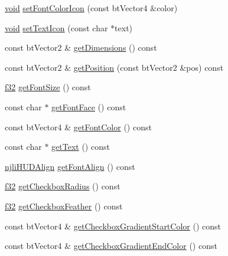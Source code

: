 \begin{DoxyCompactItemize}
\item 
\mbox{\hyperlink{_thread_8h_af1e856da2e658414cb2456cb6f7ebc66}{void}} \mbox{\hyperlink{classnjli_1_1_checkbox_h_u_d_ab23a6ab181e6698b8653c0c8f45a5b78}{set\+Font\+Color\+Icon}} (const bt\+Vector4 \&color)
\item 
\mbox{\hyperlink{_thread_8h_af1e856da2e658414cb2456cb6f7ebc66}{void}} \mbox{\hyperlink{classnjli_1_1_checkbox_h_u_d_ab1fe6f159b1937786b4c070c682220f9}{set\+Text\+Icon}} (const char $\ast$text)
\item 
const bt\+Vector2 \& \mbox{\hyperlink{classnjli_1_1_checkbox_h_u_d_aeb52009f01f539521dc28b4db919a148}{get\+Dimensions}} () const
\item 
const bt\+Vector2 \& \mbox{\hyperlink{classnjli_1_1_checkbox_h_u_d_a88e5d4d16effbda2538969d951b054a3}{get\+Position}} (const bt\+Vector2 \&pos) const
\item 
\mbox{\hyperlink{_util_8h_a5f6906312a689f27d70e9d086649d3fd}{f32}} \mbox{\hyperlink{classnjli_1_1_checkbox_h_u_d_a3a31f385e84c25268b677583af6fdd62}{get\+Font\+Size}} () const
\item 
const char $\ast$ \mbox{\hyperlink{classnjli_1_1_checkbox_h_u_d_a2c42628c8c36649eab6e05a5737d7abb}{get\+Font\+Face}} () const
\item 
const bt\+Vector4 \& \mbox{\hyperlink{classnjli_1_1_checkbox_h_u_d_a291bcdad7b79356d6820a0224c15a85c}{get\+Font\+Color}} () const
\item 
const char $\ast$ \mbox{\hyperlink{classnjli_1_1_checkbox_h_u_d_a22abee806c987db2852b4475d41d62bf}{get\+Text}} () const
\item 
\mbox{\hyperlink{namespacenjli_a376c3102aef4710f2b54a545bf0e2b3a}{njli\+H\+U\+D\+Align}} \mbox{\hyperlink{classnjli_1_1_checkbox_h_u_d_a92870d62459f239e7866f9fbf32757a9}{get\+Font\+Align}} () const
\item 
\mbox{\hyperlink{_util_8h_a5f6906312a689f27d70e9d086649d3fd}{f32}} \mbox{\hyperlink{classnjli_1_1_checkbox_h_u_d_a2688c95a6e4cc7746e929c2be50525af}{get\+Checkbox\+Radius}} () const
\item 
\mbox{\hyperlink{_util_8h_a5f6906312a689f27d70e9d086649d3fd}{f32}} \mbox{\hyperlink{classnjli_1_1_checkbox_h_u_d_a44f03f6c6af1876befd9f32cf1c442be}{get\+Checkbox\+Feather}} () const
\item 
const bt\+Vector4 \& \mbox{\hyperlink{classnjli_1_1_checkbox_h_u_d_afb56efe6ec76e058e5a6e71b9f8adbe9}{get\+Checkbox\+Gradient\+Start\+Color}} () const
\item 
const bt\+Vector4 \& \mbox{\hyperlink{classnjli_1_1_checkbox_h_u_d_ab2491d18a6d6503da3b2952ce8838101}{get\+Checkbox\+Gradient\+End\+Color}} () const

\end{DoxyCompactItemize}
